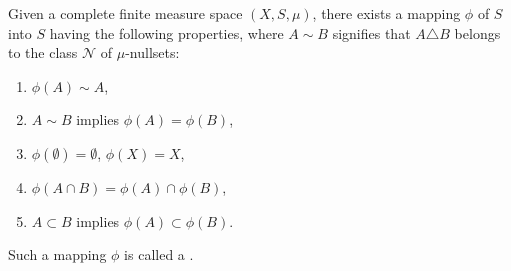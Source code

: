 Given a complete finite measure space $(X, S, \mu)$, there exists a mapping $\phi$ of $S$ into $S$ having the following properties, where $A \sim B$ signifies that $A \triangle B$ belongs to the class $\mathcal{N}$ of $\mu$-nullsets:
\begin{enumerate}
\item[1)] $\phi(A) \sim A$,
\item[2)] $A \sim B$ implies $\phi(A) = \phi(B)$,
\item[3)] $\phi(\emptyset) = \emptyset$, $\phi(X) = X$,
\item[4)] $\phi(A \cap B) = \phi(A) \cap \phi(B)$,
\item[5)] $A \subset B$ implies $\phi(A) \subset \phi(B)$.
\end{enumerate}
Such a mapping $\phi$ is called a .
